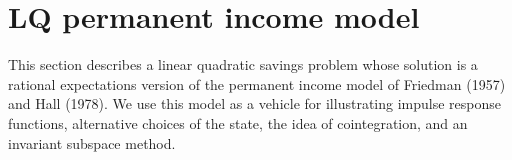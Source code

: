 %
%
 
%
%
%
%
%


\section{LQ permanent income model}\label{sec:LQmodel}%
This section describes a linear quadratic savings problem
whose solution is a rational expectations version of the permanent
income model of Friedman  (1957) and Hall (1978). We use this
model as a vehicle for illustrating impulse response functions,
alternative choices of the state, the idea of cointegration,
and an invariant subspace method.
%

